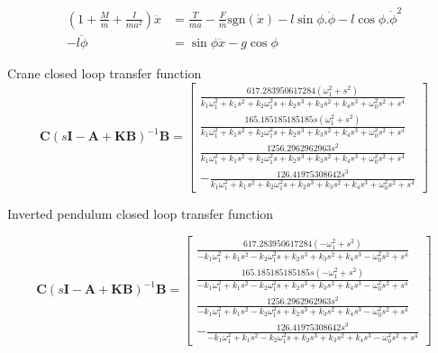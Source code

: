 \documentclass{article}
\begin{document}
\begin{align}
  \left( 1 + \frac{M}{m} + \frac{I}{ma^2} \right) \ddot{x} &= \frac{T}{ma} - \frac{F}{m}\text{sgn}(\dot{x}) - l\sin\phi . \ddot{\phi} - l\cos\phi . \dot{\phi}^2 \\
   - l \ddot{\phi} &= \sin\phi \ddot{x} - g\cos\phi
\end{align}

Crane closed loop transfer function
\begin{equation}
  \mathbf{C} (s\mathbf{I} - \mathbf{A} + \mathbf{KB}) ^{-1} \mathbf{B} = \left[\begin{matrix}\frac{617.283950617284 \left(\omega_{1}^{2} + s^{2}\right)}{k_{1} \omega_{1}^{2} + k_{1} s^{2} + k_{2} \omega_{1}^{2} s + k_{2} s^{3} + k_{3} s^{2} + k_{4} s^{3} + \omega_{0}^{2} s^{2} + s^{4}}\\\frac{165.185185185185 s \left(\omega_{1}^{2} + s^{2}\right)}{k_{1} \omega_{1}^{2} + k_{1} s^{2} + k_{2} \omega_{1}^{2} s + k_{2} s^{3} + k_{3} s^{2} + k_{4} s^{3} + \omega_{0}^{2} s^{2} + s^{4}}\\\frac{1256.2962962963 s^{2}}{k_{1} \omega_{1}^{2} + k_{1} s^{2} + k_{2} \omega_{1}^{2} s + k_{2} s^{3} + k_{3} s^{2} + k_{4} s^{3} + \omega_{0}^{2} s^{2} + s^{4}}\\- \frac{126.41975308642 s^{3}}{k_{1} \omega_{1}^{2} + k_{1} s^{2} + k_{2} \omega_{1}^{2} s + k_{2} s^{3} + k_{3} s^{2} + k_{4} s^{3} + \omega_{0}^{2} s^{2} + s^{4}}\end{matrix}\right]
\end{equation}

Inverted pendulum closed loop transfer function

\begin{equation}
  \mathbf{C} (s\mathbf{I} - \mathbf{A} + \mathbf{KB}) ^{-1} \mathbf{B} = \left[\begin{matrix}\frac{617.283950617284 \left(- \omega_{1}^{2} + s^{2}\right)}{- k_{1} \omega_{1}^{2} + k_{1} s^{2} - k_{2} \omega_{1}^{2} s + k_{2} s^{3} + k_{3} s^{2} + k_{4} s^{3} - \omega_{0}^{2} s^{2} + s^{4}}\\\frac{165.185185185185 s \left(- \omega_{1}^{2} + s^{2}\right)}{- k_{1} \omega_{1}^{2} + k_{1} s^{2} - k_{2} \omega_{1}^{2} s + k_{2} s^{3} + k_{3} s^{2} + k_{4} s^{3} - \omega_{0}^{2} s^{2} + s^{4}}\\\frac{1256.2962962963 s^{2}}{- k_{1} \omega_{1}^{2} + k_{1} s^{2} - k_{2} \omega_{1}^{2} s + k_{2} s^{3} + k_{3} s^{2} + k_{4} s^{3} - \omega_{0}^{2} s^{2} + s^{4}}\\- \frac{126.41975308642 s^{3}}{- k_{1} \omega_{1}^{2} + k_{1} s^{2} - k_{2} \omega_{1}^{2} s + k_{2} s^{3} + k_{3} s^{2} + k_{4} s^{3} - \omega_{0}^{2} s^{2} + s^{4}}\end{matrix}\right]
\end{equation}
\end{document}
